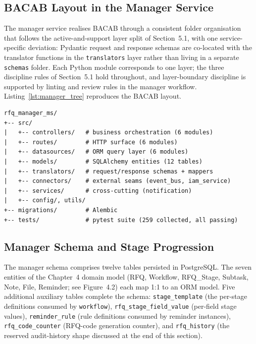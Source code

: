 \subsection{BACAB Layout in the Manager Service}
The manager service realises BACAB through a consistent folder organisation that follows the active-and-support layer split of Section~5.1, with one service-specific deviation: Pydantic request and response schemas are co-located with the translator functions in the \texttt{translators} layer rather than living in a separate \texttt{schemas} folder. Each Python module corresponds to one layer; the three discipline rules of Section~5.1 hold throughout, and layer-boundary discipline is supported by linting and review rules in the manager workflow. Listing~\ref{lst:manager_tree} reproduces the BACAB layout.

\begin{lstlisting}[basicstyle=\ttfamily\footnotesize, frame=single, captionpos=b, label={lst:manager_tree}, caption={BACAB layout of \texttt{rfq\_manager\_ms} (depth 2)}]
rfq_manager_ms/
+-- src/
|   +-- controllers/   # business orchestration (6 modules)
|   +-- routes/        # HTTP surface (6 modules)
|   +-- datasources/   # ORM query layer (6 modules)
|   +-- models/        # SQLAlchemy entities (12 tables)
|   +-- translators/   # request/response schemas + mappers
|   +-- connectors/    # external seams (event_bus, iam_service)
|   +-- services/      # cross-cutting (notification)
|   +-- config/, utils/
+-- migrations/        # Alembic
+-- tests/             # pytest suite (259 collected, all passing)
\end{lstlisting}

\subsection{Manager Schema and Stage Progression}
The manager schema comprises twelve tables persisted in PostgreSQL. The seven entities of the Chapter~4 domain model (RFQ, Workflow, RFQ\_Stage, Subtask, Note, File, Reminder; see Figure~4.2) each map 1:1 to an ORM model. Five additional auxiliary tables complete the schema: \texttt{stage\_template} (the per-stage definitions consumed by \texttt{workflow}), \texttt{rfq\_stage\_field\_value} (per-field stage values), \texttt{reminder\_rule} (rule definitions consumed by reminder instances), \texttt{rfq\_code\_counter} (RFQ-code generation counter), and \texttt{rfq\_history} (the reserved audit-history shape discussed at the end of this section).

